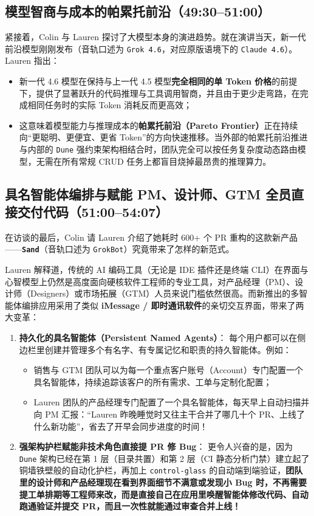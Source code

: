 \documentclass[a4paper]{article}
\begin{document}
\subsection{模型智商与成本的帕累托前沿（49:30--51:00）}

紧接着，Colin 与 Lauren 探讨了大模型本身的演进趋势。就在演讲当天，新一代前沿模型刚刚发布（音轨口述为 \texttt{Grok 4.6}，对应原版语境下的 \texttt{Claude 4.6}）。Lauren 指出：
\begin{itemize}
  \item 新一代 4.6 模型在保持与上一代 4.5 模型\textbf{完全相同的单 Token 价格}的前提下，提供了显著跃升的代码推理与工具调用智商，并且由于更少走弯路，在完成相同任务时的实际 Token 消耗反而更高效；
  \item 这意味着模型能力与推理成本的\textbf{帕累托前沿（Pareto Frontier）}正在持续向“更聪明、更便宜、更省 Token”的方向快速推移。当外部的帕累托前沿推进与内部的 \texttt{Dune} 强约束架构相结合时，团队完全可以按任务复杂度动态路由模型，无需在所有常规 CRUD 任务上都盲目烧掉最昂贵的推理算力。
\end{itemize}

\subsection{具名智能体编排与赋能 PM、设计师、GTM 全员直接交付代码（51:00--54:07）}

在访谈的最后，Colin 请 Lauren 介绍了她耗时 600+ 个 PR 重构的这款新产品——\textbf{\texttt{Sand}}（音轨口述为 \texttt{GrokBot}）究竟带来了怎样的新范式。

Lauren 解释道，传统的 AI 编码工具（无论是 IDE 插件还是终端 CLI）在界面与心智模型上仍然是高度面向硬核软件工程师的专业工具，对产品经理（PM）、设计师（Designers）或市场拓展（GTM）人员来说门槛依然很高。而新推出的多智能体编排应用采用了类似 \textbf{iMessage / 即时通讯软件}的亲切交互界面，带来了两大变革：
\begin{enumerate}
  \item \textbf{持久化的具名智能体（Persistent Named Agents）}：
  每个用户都可以在侧边栏里创建并管理多个有名字、有专属记忆和职责的持久智能体。例如：
  \begin{itemize}
    \item 销售与 GTM 团队可以为每一个重点客户账号（Account）专门配置一个具名智能体，持续追踪该客户的所有需求、工单与定制化配置；
    \item Lauren 团队的产品经理专门配置了一个具名智能体，每天早上自动扫描并向 PM 汇报：“Lauren 昨晚睡觉时又往主干合并了哪几十个 PR、上线了什么新功能”，省去了开早会同步进度的时间！
  \end{itemize}
  \item \textbf{强架构护栏赋能非技术角色直接提 PR 修 Bug}：
  更令人兴奋的是，因为 \texttt{Dune} 架构已经在第 1 层（目录共置）和第 2 层（CI 静态分析门禁）建立起了铜墙铁壁般的自动化护栏，再加上 \texttt{control-glass} 的自动端到端验证，\textbf{团队里的设计师和产品经理现在看到界面细节不满意或发现小 Bug 时，不再需要提工单排期等工程师来改，而是直接自己在应用里唤醒智能体修改代码、自动跑通验证并提交 PR，而且一次性就能通过审查合并上线！}
\end{enumerate}
\end{document}
